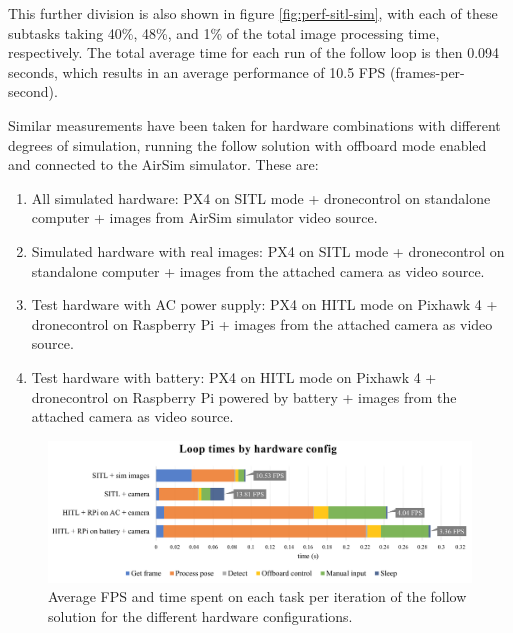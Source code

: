 This further division is also shown in figure \ref{fig:perf-sitl-sim}, with each of these subtasks taking 40\%, 48\%, and 1\% of the total image processing time, respectively.
The total average time for each run of the follow loop is then 0.094 seconds, which results in an average performance of 10.5 FPS (frames-per-second).

Similar measurements have been taken for hardware combinations with different degrees of simulation, running the follow solution with offboard mode enabled and connected to the AirSim simulator.
These are:
\begin{enumerate}
    \item All simulated hardware: PX4 on SITL mode + dronecontrol on standalone computer + images from AirSim simulator video source.
    \item Simulated hardware with real images: PX4 on SITL mode + dronecontrol on standalone computer + images from the attached camera as video source.
    \item Test hardware with AC power supply: PX4 on HITL mode on Pixhawk 4 + dronecontrol on Raspberry Pi + images from the attached camera as video source.
    \item Test hardware with battery: PX4 on HITL mode on Pixhawk 4 + dronecontrol on Raspberry Pi powered by battery + images from the attached camera as video source.
\end{enumerate}


\begin{figure}
  \centering
  \includegraphics[width=\textwidth, keepaspectratio]{img/performance-graph.png}
  \caption{Average FPS and time spent on each task per iteration of the follow solution for the different hardware configurations.}
  \label{fig:perf-analysis}
\end{figure}


